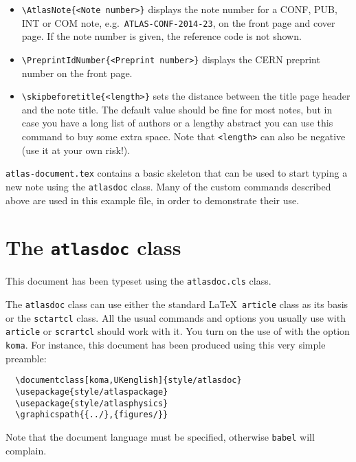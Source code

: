 \documentclass[koma,UKenglish]{style/atlasdoc}
\begin{document}
\begin{itemize}
  \item {\verb|\AtlasNote{<Note number>}|} displays the note number
  	for a CONF, PUB, INT or COM note, e.g.\ \texttt{ATLAS-CONF-2014-23},
  	on the front page and cover page.
  	If the note number is given, the reference code is not shown.

  \item {\verb|\PreprintIdNumber{<Preprint number>}|} displays the CERN
  	preprint number on the front page.

  \item {\verb|\skipbeforetitle{<length>}|} sets the distance between
    the title page header and the note title. The default value should
    be fine for most notes, but in case you have a long list of
    authors or a lengthy abstract you can use this command to buy
    some extra space. Note that \verb|<length>| can also be negative
    (use it at your own risk!).
\end{itemize}

\noindent \texttt{atlas-document.tex} contains a basic skeleton that can be
used to start typing a new note using the \texttt{atlasdoc} class. Many of
the custom commands described above are used in this example file, in
order to demonstrate their use.


\section{The \texttt{atlasdoc} class}
\label{app:atlasdoc}

This document has been typeset using the \texttt{atlasdoc.cls} class.

The \texttt{atlasdoc} class can use either the standard \LaTeX\ \texttt{article} class
as its basis or the \KOMAScript \texttt{sctartcl} class.
All the usual commands and options you usually use
with \texttt{article}  or \texttt{scrartcl} should work with it. 
You turn on the use of \KOMAScript with the option \texttt{koma}.
For instance, this document has
been produced using this very simple preamble:
%
\begin{verbatim}
  \documentclass[koma,UKenglish]{style/atlasdoc}
  \usepackage{style/atlaspackage}
  \usepackage{style/atlasphysics}
  \graphicspath{{../},{figures/}}
\end{verbatim}
%
Note that the document language must be specified, otherwise \texttt{babel} will complain.
\end{document}

